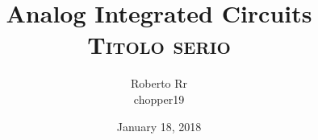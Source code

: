 \documentclass[11pt,a4paper,twoside,openright]{article}
\title{	Analog Integrated Circuits \\
	\huge {\textsc{Titolo serio}}	}
\begin{document}
\author{Roberto Rr\\ chopper19\\
}
\date{January 18, 2018}
\maketitle 		
\tableofcontents


\end{document}
